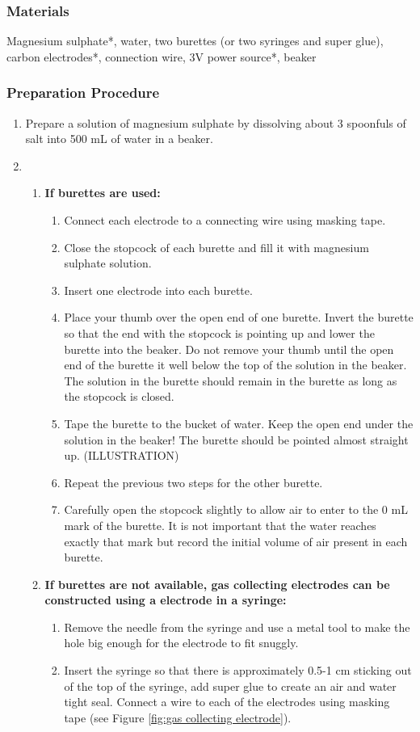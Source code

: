 \subsubsection*{Materials}
Magnesium sulphate*, water, two burettes (or two syringes and super glue), carbon electrodes*, connection wire, 3V power source*, beaker

\subsubsection*{Preparation Procedure}
\begin{enumerate}
\item{Prepare a solution of magnesium sulphate by dissolving about 3 spoonfuls of salt into 500 mL of water in a beaker.}
\item{}
\begin{enumerate}
\item{\textbf{If burettes are used:}}
\begin{enumerate}
\item{Connect each electrode to a connecting wire using masking tape.}
\item{Close the stopcock of each burette and fill it with magnesium sulphate solution.} 
\item{Insert one electrode into each burette.}
\item{Place your thumb over the open end of one burette. Invert the burette so that the end with the stopcock is pointing up and lower the burette into the beaker. Do not remove your thumb until the open end of the burette it well below the top of the solution in the beaker. The solution in the burette should remain in the burette as long as the stopcock is closed.}
\item{Tape the burette to the bucket of water. Keep the open end under the solution in the beaker! The burette should be pointed almost straight up. (ILLUSTRATION)}
\item{Repeat the previous two steps for the other burette.}
\item{Carefully open the stopcock slightly to allow air to enter to the 0 mL mark of the burette. It is not important that the water reaches exactly that mark but record the initial volume of air present in each burette.}
\end{enumerate}
\item{\textbf{If burettes are not available, gas collecting electrodes can be constructed using a electrode in a syringe:}}
\begin{enumerate}
\item{Remove the needle from the syringe and use a metal tool to make the hole big enough for the electrode to fit snuggly.}
\item{Insert the syringe so that there is approximately 0.5-1 cm sticking out of the top of the syringe, add super glue to create an air and water tight seal. Connect a wire to each of the electrodes using masking tape (see Figure \ref{fig:gas collecting electrode}).

}
\end{enumerate}
\end{enumerate}
\end{enumerate}
